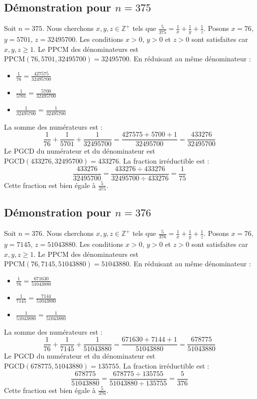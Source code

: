 \documentclass[11pt,a4paper]{article}
\begin{document}
\subsection{Démonstration pour $n = 375$}
Soit $n = 375$. Nous cherchons $x, y, z \in \mathbb{Z}^{+}$ tels que $\frac{5}{375} = \frac{1}{x} + \frac{1}{y} + \frac{1}{z}$.
Posons $x = 76$, $y = 5701$, $z = 32495700$.
Les conditions $x > 0$, $y > 0$ et $z > 0$ sont satisfaites car $x, y, z \geq 1$.
Le PPCM des dénominateurs est $\text{PPCM}(76, 5701, 32495700) = 32495700$.
En réduisant au même dénominateur :
\begin{itemize}
    \item $\frac{1}{76} = \frac{427575}{32495700}$
    \item $\frac{1}{5701} = \frac{5700}{32495700}$
    \item $\frac{1}{32495700} = \frac{1}{32495700}$
\end{itemize}
La somme des numérateurs est :
$$ \frac{1}{76} + \frac{1}{5701} + \frac{1}{32495700} = \frac{427575 + 5700 + 1}{32495700} = \frac{433276}{32495700} $$
Le PGCD du numérateur et du dénominateur est $\text{PGCD}(433276, 32495700) = 433276$.
La fraction irréductible est :
$$ \frac{433276}{32495700} = \frac{433276 \div 433276}{32495700 \div 433276} = \frac{1}{75} $$
Cette fraction est bien égale à $\frac{5}{375}$.

\subsection{Démonstration pour $n = 376$}
Soit $n = 376$. Nous cherchons $x, y, z \in \mathbb{Z}^{+}$ tels que $\frac{5}{376} = \frac{1}{x} + \frac{1}{y} + \frac{1}{z}$.
Posons $x = 76$, $y = 7145$, $z = 51043880$.
Les conditions $x > 0$, $y > 0$ et $z > 0$ sont satisfaites car $x, y, z \geq 1$.
Le PPCM des dénominateurs est $\text{PPCM}(76, 7145, 51043880) = 51043880$.
En réduisant au même dénominateur :
\begin{itemize}
    \item $\frac{1}{76} = \frac{671630}{51043880}$
    \item $\frac{1}{7145} = \frac{7144}{51043880}$
    \item $\frac{1}{51043880} = \frac{1}{51043880}$
\end{itemize}
La somme des numérateurs est :
$$ \frac{1}{76} + \frac{1}{7145} + \frac{1}{51043880} = \frac{671630 + 7144 + 1}{51043880} = \frac{678775}{51043880} $$
Le PGCD du numérateur et du dénominateur est $\text{PGCD}(678775, 51043880) = 135755$.
La fraction irréductible est :
$$ \frac{678775}{51043880} = \frac{678775 \div 135755}{51043880 \div 135755} = \frac{5}{376} $$
Cette fraction est bien égale à $\frac{5}{376}$.
\end{document}
